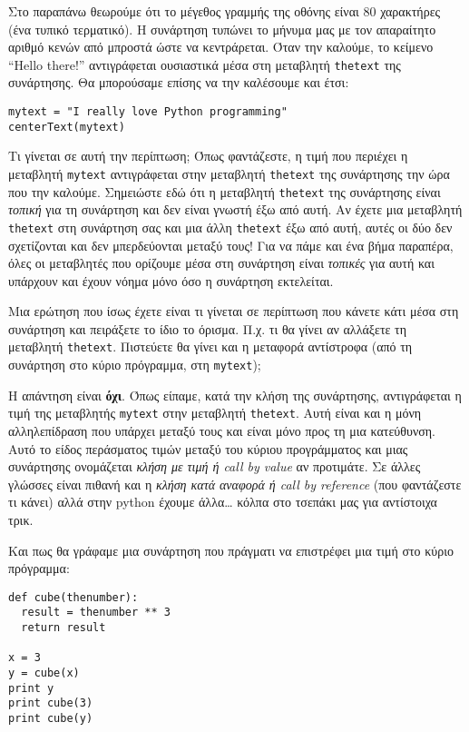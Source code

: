 Στο παραπάνω θεωρούμε ότι το μέγεθος γραμμής της οθόνης είναι 80
χαρακτήρες (ένα τυπικό τερματικό).  Η συνάρτηση τυπώνει το μήνυμα μας
με τον απαραίτητο αριθμό κενών από μπροστά ώστε να κεντράρεται.
Όταν την καλούμε, το κείμενο ``Hello there!'' αντιγράφεται ουσιαστικά μέσα
στη μεταβλητή {\tt thetext} της συνάρτησης. Θα μπορούσαμε επίσης
να την καλέσουμε και έτσι:

\begin{verbatim}
mytext = "I really love Python programming"
centerText(mytext)
\end{verbatim}

Τι γίνεται σε αυτή την περίπτωση; Όπως φαντάζεστε, η τιμή που περιέχει
η μεταβλητή {\tt mytext} αντιγράφεται στην μεταβλητή {\tt thetext} της συνάρτησης
την ώρα που την καλούμε. Σημειώστε εδώ ότι η μεταβλητή {\tt thetext}
της συνάρτησης είναι {\em τοπική} για τη συνάρτηση και δεν
είναι γνωστή έξω από αυτή. Αν έχετε μια μεταβλητή {\tt thetext} στη συνάρτηση
σας και μια άλλη {\tt thetext} έξω από αυτή, αυτές οι δύο δεν σχετίζονται και
δεν μπερδεύονται μεταξύ τους! Για να πάμε και ένα βήμα παραπέρα, όλες
οι μεταβλητές που ορίζουμε μέσα στη συνάρτηση είναι {\em τοπικές} για αυτή
και υπάρχουν και έχουν νόημα μόνο όσο η συνάρτηση εκτελείται.

Μια ερώτηση που ίσως έχετε είναι τι γίνεται σε περίπτωση που κάνετε κάτι
μέσα στη συνάρτηση και πειράξετε το ίδιο το όρισμα. Π.χ. τι θα γίνει
αν αλλάξετε τη μεταβλητή {\tt thetext}. Πιστεύετε θα γίνει και η μεταφορά
αντίστροφα (από τη συνάρτηση στο κύριο πρόγραμμα, στη {\tt mytext});

Η απάντηση είναι {\bf όχι}. Όπως είπαμε, κατά την κλήση της
συνάρτησης, αντιγράφεται η τιμή της μεταβλητής {\tt mytext} στην μεταβλητή
{\tt thetext}. Αυτή είναι και η μόνη αλληλεπίδραση που υπάρχει μεταξύ τους
και είναι μόνο προς τη μια κατεύθυνση. Αυτό το είδος περάσματος τιμών
μεταξύ του κύριου προγράμματος και μιας συνάρτησης ονομάζεται
{\em κλήση με τιμή ή call by value} αν προτιμάτε. Σε άλλες
γλώσσες είναι πιθανή και η {\em κλήση κατά αναφορά ή
call by reference} (που φαντάζεστε τι κάνει) αλλά στην python
έχουμε άλλα\ldots{} κόλπα στο τσεπάκι μας για αντίστοιχα τρικ.

Και πως θα γράφαμε μια συνάρτηση που πράγματι να επιστρέφει μια τιμή
στο κύριο πρόγραμμα:

\begin{verbatim}
def cube(thenumber):
  result = thenumber ** 3
  return result

x = 3
y = cube(x)
print y
print cube(3)
print cube(y)
\end{verbatim}


